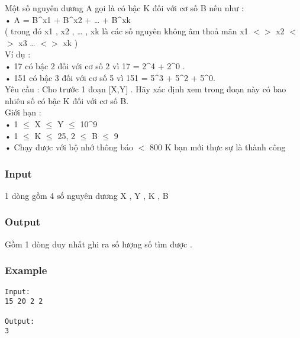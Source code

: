 



   Một số nguyên dương A gọi là có bậc K đối với cơ số B nếu như :   
\\   • A = B^x1 + B^x2 + … + B^xk   
\\   ( trong đó x1 , x2 , … , xk là các số nguyên không âm thoả mãn x1 $<$$>$ x2 $<$$>$ x3 … $<$$>$ xk )   
\\   Ví dụ :   
\\   • 17 có bậc 2 đối với cơ số 2 vì 17 = 2^4 + 2^0 .   
\\   • 151 có bậc 3 đối với cơ số 5 vì 151 = 5^3 + 5^2 + 5^0.   
\\   Yêu cầu : Cho trước 1 đoạn [X,Y] . Hãy xác định xem trong đoạn này có bao nhiêu số có bậc K đối với cơ số B.   
\\   Giới hạn :   
\\   • 1  $\le$  X  $\le$  Y  $\le$  10^9   
\\   • 1  $\le$  K  $\le$  25, 2  $\le$  B  $\le$  9   
\\   • Chạy được với bộ nhớ thông báo $<$ 800 K bạn mới thực sự là thành công   
\\

\subsubsection{   Input  }

   1 dòng gồm 4 số nguyên dương X , Y , K , B  

\subsubsection{   Output  }

   Gồm 1 dòng duy nhất ghi ra số lượng số tìm được .  

\subsubsection{   Example  }
\begin{verbatim}
Input:
15 20 2 2

Output:
3 
\end{verbatim}
